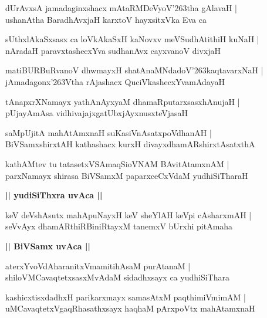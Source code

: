 \documentclass[twoside,12pt,openright]{book}
\def\S{\char'263}
\newcounter{shloka}[chapter]
\def\uvaca#1{\centerline{{\large\textbf{#1}}}}
\begin{document}
\begin{shloka}%
dUrAvxsA jamadaginxshacx mAtaRMDeVyoV\S tha gAlavaH |\\
ushanAtha BaradhAvxjaH karxtoV hayxsitxVka Eva ca
\end{shloka}

\begin{shloka}%
sUthxlAkaSxsasx ca loVkAkaSxH kaNovxv meVSudhAtithiH kuNaH |\\
nAradaH paravxtashecxYva sudhanAvx cayxvanoV divxjaH 
\end{shloka}

\begin{shloka}%
matiBURBuRvanoV dhwmayxH shatAnaMNdadoV\S kaqtavarxNaH |\\
jAmadagonx\S Vtha rAjashacx QuciVkashecxYvamAdayaH 
\end{shloka}

\begin{shloka}%
tAnapxrXNamayx yathAnAyxyaM dhamaRputarxsasxhAnujaH |\\
pUjayAmAsa vidhivajajxgatUbxjAyxnusxteVjasaH 
\end{shloka}

\begin{shloka}%
saMpUjitA mahAtAmxnaH suKasiVnAsatxpoVdhanAH |\\
BiVSamxshirxtAH kathashacx kurxH divayxdhamARshirxtAsatxthA 
\end{shloka}

\begin{shloka}%
kathAMtev tu tatasetxVSAmaqSioVNAM BAvitAtamxnAM |\\
parxNamayx shirasa BiVSamxM paparxceCxVdaM yudhiSiTharaH 
\end{shloka}

\uvaca{|| yudiSiThxra uvAca ||}

\begin{shloka}%
keV deVshAsutx mahApuNayxH keV sheYlAH keVpi cAsharxmAH |\\
seVvAyx dhamARthiRBiniRtayxM tanemxV bUrxhi pitAmaha
\end{shloka}

\uvaca{|| BiVSamx uvAca ||}

\begin{shloka}%
aterxYvoVdAharanitxVmamitihAsaM purAtanaM |\\
shiloVMCavaqtetxsasxMvAdaM sidadhxsayx ca yudhiSiThara 
\end{shloka}

\begin{shloka}%
kashicxtisxdadhxH parikarxmayx samasAtxM paqthimiVmimAM |\\
uMCavaqtetxVgaqRhasathxsayx haqhaM pArxpoVtx mahAtamxnaH 
\end{shloka}
\end{document}
